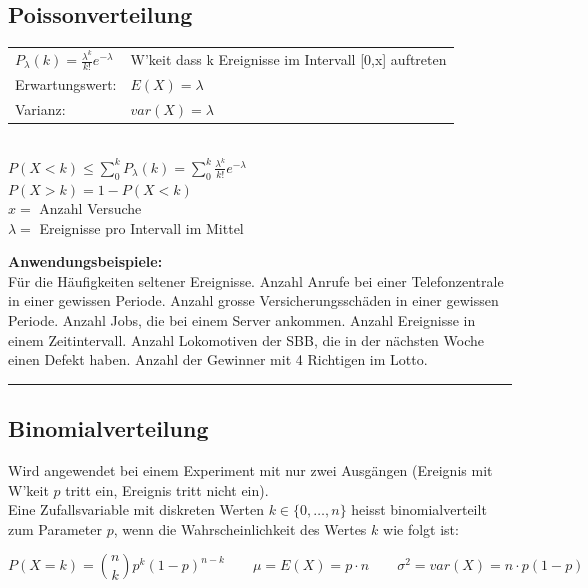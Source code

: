 	\subsection{Poissonverteilung \skript{\pageref{sk-section-poissonverteilung}}}
	\begin{multicols}{2}
		\begin{tabular}{ll}
        $P_\lambda(k)=\frac{\lambda^k}{k!}e^{-\lambda}$ &
         \parbox{4cm}{W'keit dass k Ereignisse im Intervall [0,x] auftreten} \\
        Erwartungswert:  & $E(X)=\lambda$\\
        Varianz:  & $var(X)=\lambda$ \\
        \end{tabular} \\
         $P(X<k) \leq \sum_0^k P_\lambda(k)=\sum_0^k \frac{\lambda^k}{k!}e^{-\lambda}$ \\
         $P(X>k) = 1-P(X<k)$ \\
        $x =$ Anzahl Versuche\\
        $\lambda =$ Ereignisse pro Intervall im Mittel
        \columnbreak
        
        {\bf Anwendungsbeispiele:} \\ Für die Häufigkeiten seltener
        Ereignisse. Anzahl Anrufe bei einer Telefonzentrale in einer gewissen
        Periode. Anzahl grosse Versicherungsschäden in einer gewissen Periode.
        Anzahl Jobs, die bei einem Server ankommen. Anzahl Ereignisse in
        einem Zeitintervall. Anzahl Lokomotiven der SBB, die in der nächsten Woche 
        einen Defekt haben. Anzahl der Gewinner mit 4 Richtigen im Lotto.
     \end{multicols}
        
\hrule
	\subsection{Binomialverteilung \skript{\pageref{sk-section-binomialverteilung}}}
		
    	Wird angewendet bei einem Experiment mit nur zwei Ausgängen (Ereignis mit W'keit $p$ tritt
    	ein, Ereignis tritt nicht ein). \\
    	Eine Zufallsvariable mit diskreten Werten $k \in \{
    	0,\ldots,n \}$ heisst binomialverteilt zum Parameter $p$, wenn die
        Wahrscheinlichkeit des Wertes $k$ wie folgt ist:

      $$P(X=k) = \binom n k p^k(1-p)^{n-k} \qquad \mu = E(X) = p \cdot n \qquad \sigma^2 =
      var(X) = n \cdot p (1-p)$$


